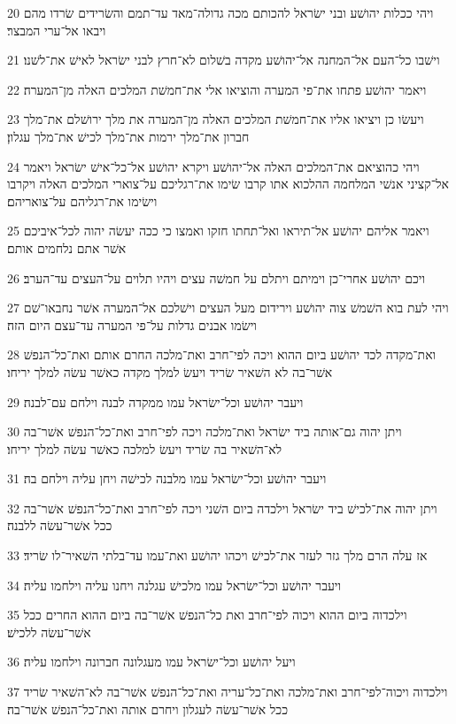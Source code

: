 \par 20 ויהי ככלות יהושׁע ובני ישׂראל להכותם מכה גדולה־מאד עד־תמם והשׂרידים שׂרדו מהם ויבאו אל־ערי המבצר׃
\par 21 וישׁבו כל־העם אל־המחנה אל־יהושׁע מקדה בשׁלום לא־חרץ לבני ישׂראל לאישׁ את־לשׁנו׃
\par 22 ויאמר יהושׁע פתחו את־פי המערה והוציאו אלי את־חמשׁת המלכים האלה מן־המערה׃
\par 23 ויעשׂו כן ויציאו אליו את־חמשׁת המלכים האלה מן־המערה את מלך ירושׁלם את־מלך חברון את־מלך ירמות את־מלך לכישׁ את־מלך עגלון׃
\par 24 ויהי כהוציאם את־המלכים האלה אל־יהושׁע ויקרא יהושׁע אל־כל־אישׁ ישׂראל ויאמר אל־קציני אנשׁי המלחמה ההלכוא אתו קרבו שׂימו את־רגליכם על־צוארי המלכים האלה ויקרבו וישׂימו את־רגליהם על־צואריהם׃
\par 25 ויאמר אליהם יהושׁע אל־תיראו ואל־תחתו חזקו ואמצו כי ככה יעשׂה יהוה לכל־איביכם אשׁר אתם נלחמים אותם׃
\par 26 ויכם יהושׁע אחרי־כן וימיתם ויתלם על חמשׁה עצים ויהיו תלוים על־העצים עד־הערב׃
\par 27 ויהי לעת בוא השׁמשׁ צוה יהושׁע וירידום מעל העצים וישׁלכם אל־המערה אשׁר נחבאו־שׁם וישׂמו אבנים גדלות על־פי המערה עד־עצם היום הזה׃
\par 28 ואת־מקדה לכד יהושׁע ביום ההוא ויכה לפי־חרב ואת־מלכה החרם אותם ואת־כל־הנפשׁ אשׁר־בה לא השׁאיר שׂריד ויעשׂ למלך מקדה כאשׁר עשׂה למלך יריחו׃
\par 29 ויעבר יהושׁע וכל־ישׂראל עמו ממקדה לבנה וילחם עם־לבנה׃
\par 30 ויתן יהוה גם־אותה ביד ישׂראל ואת־מלכה ויכה לפי־חרב ואת־כל־הנפשׁ אשׁר־בה לא־השׁאיר בה שׂריד ויעשׂ למלכה כאשׁר עשׂה למלך יריחו׃
\par 31 ויעבר יהושׁע וכל־ישׂראל עמו מלבנה לכישׁה ויחן עליה וילחם בה׃
\par 32 ויתן יהוה את־לכישׁ ביד ישׂראל וילכדה ביום השׁני ויכה לפי־חרב ואת־כל־הנפשׁ אשׁר־בה ככל אשׁר־עשׂה ללבנה׃
\par 33 אז עלה הרם מלך גזר לעזר את־לכישׁ ויכהו יהושׁע ואת־עמו עד־בלתי השׁאיר־לו שׂריד׃
\par 34 ויעבר יהושׁע וכל־ישׂראל עמו מלכישׁ עגלנה ויחנו עליה וילחמו עליה׃
\par 35 וילכדוה ביום ההוא ויכוה לפי־חרב ואת כל־הנפשׁ אשׁר־בה ביום ההוא החרים ככל אשׁר־עשׂה ללכישׁ׃
\par 36 ויעל יהושׁע וכל־ישׂראל עמו מעגלונה חברונה וילחמו עליה׃
\par 37 וילכדוה ויכוה־לפי־חרב ואת־מלכה ואת־כל־עריה ואת־כל־הנפשׁ אשׁר־בה לא־השׁאיר שׂריד ככל אשׁר־עשׂה לעגלון ויחרם אותה ואת־כל־הנפשׁ אשׁר־בה׃
